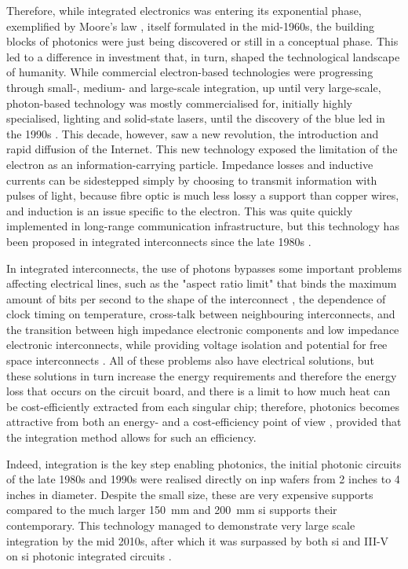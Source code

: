 Therefore, while integrated electronics was entering its exponential phase, exemplified by Moore's law \cite{Moore1965}, itself formulated in the mid-1960s, the building blocks of photonics were just being discovered or still in a conceptual phase. This led to a difference in investment that, in turn, shaped the technological landscape of humanity. While commercial electron-based technologies were progressing through small-, medium- and large-scale integration, up until very large-scale, photon-based technology was mostly commercialised for, initially highly specialised, lighting and solid-state lasers, until the discovery of the blue \acs{led} in the 1990s \cite{Nakamura1994}. This decade, however, saw a new revolution, the introduction and rapid diffusion of the Internet. This new technology exposed the limitation of the electron as an information-carrying particle. Impedance losses and inductive currents can be sidestepped simply by choosing to transmit information with pulses of light, because fibre optic is much less lossy a support than copper wires, and induction is an issue specific to the electron. This was quite quickly implemented in long-range communication infrastructure, but this technology has been proposed in integrated interconnects since the late 1980s \cite{Miller1989}.

In integrated interconnects, the use of photons bypasses some important problems affecting electrical lines, such as the "aspect ratio limit" that binds the maximum amount of bits per second to the shape of the interconnect \cite{Miller1997}, the dependence of clock timing on temperature, cross-talk between neighbouring interconnects, and the transition between high impedance electronic components and low impedance electronic interconnects, while providing voltage isolation and potential for free space interconnects \cite{Miller1997_reasons}. All of these problems also have electrical solutions, but these solutions in turn increase the energy requirements and therefore the energy loss that occurs on the circuit board, and there is a limit to how much heat can be cost-efficiently extracted from each singular chip; therefore, photonics becomes attractive from both an energy- and a cost-efficiency point of view \cite{Miller2009}, provided that the integration method allows for such an efficiency. 

Indeed, integration is the key step enabling photonics, the initial photonic circuits of the late 1980s and 1990s were realised directly on \acf{inp} wafers from \num{2} inches to \num{4} inches in diameter. Despite the small size, these are very expensive supports compared to the much larger \qty{150}{\milli\metre} and \qty{200}{\milli\metre} \acl{si} supports their contemporary. This technology managed to demonstrate very large scale integration by the mid 2010s, after which it was surpassed by both \acl{si} and III-V on \acl{si} photonic integrated circuits \cite{Shekhar2024, Margalit2021}.

